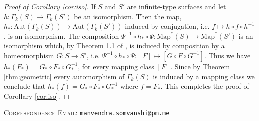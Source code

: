 \documentclass[11pt]{article}
\def\map{\text{Map}}
\def\Aut{\text{Aut}}
\begin{document}
\begin{proof}[Proof of Corollary \ref{cor:iso}]
If $S$ and $S'$ are infinite-type surfaces and let $h: \Gamma_k(S)\to \Gamma_k(S')$ be an isomorphism. Then the map, $h_*: \Aut(\Gamma_k(S))\to \Aut(\Gamma_k(S'))$ induced by conjugation, i.e. $f\mapsto h\circ f\circ h^{-1}$, is an isomorphism. The composition $\Psi^{-1}\circ h_*\circ \Psi: \map^*(S) \to \map^*(S')$ is an isomorphism which, by Theorem 1.1 of \cite{bavard}, is induced by composition by a homeomorphism $G:S\to S'$, i.e. $\Psi^{-1}\circ h_*\circ \Psi: [F] \mapsto [G\circ F\circ G^{-1}]$. Thus we have $h_*(F_*) = G_*\circ F_*\circ G^{-1}_*$, for every mapping class $[F]$. Since by Theorem \ref{thm:geometric} every automorphism of $\Gamma_k(S)$ is induced by a mapping class we conclude that $h_*(f) = G_* \circ F_* \circ G^{-1}_*$ where $f = F_*$. This completes the proof of Corollary \ref{cor:iso}.
\end{proof}

\vspace{5em}
\textsc{Correspondence Email:} \texttt{manvendra.somvanshi@pm.me}
\end{document}
